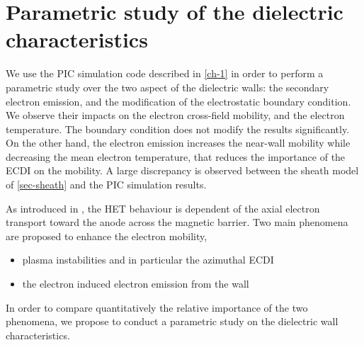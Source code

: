 



\chapter{Parametric study of the dielectric characteristics}
\label{ch-2}

\begin{Chabstract}
We use the PIC simulation code described in \cref{ch-1} in order to perform a parametric study over the two aspect of the dielectric walls\string: the secondary electron emission, and the modification of the electrostatic boundary condition.
We observe their impacts on the electron cross-field mobility, and the electron temperature.
The boundary condition does not modify the results significantly.
On the other hand, the electron emission increases the near-wall mobility while decreasing the mean electron temperature, that reduces the importance of the \ac{ECDI} on the mobility.
A large discrepancy is observed between the sheath model of \cref{sec-sheath} and the PIC simulation results.
\end{Chabstract}


\minitoc


% 
% 
% 
% 
% 
% 
% 

As introduced in , the \ac{HET} behaviour is dependent of the axial electron transport toward the anode across the magnetic barrier.
Two main phenomena are proposed to enhance the electron mobility,
\begin{itemize}
  \item plasma instabilities and in particular the azimuthal \ac{ECDI}
  \item the electron induced electron emission from the wall
\end{itemize}
In order to compare quantitatively the relative importance of the two phenomena, we propose to conduct a parametric study on the dielectric wall characteristics.

